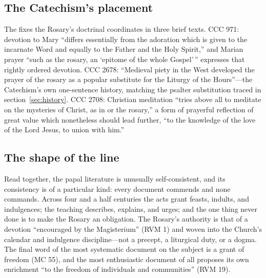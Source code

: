 \subsection{The Catechism's placement}

The  fixes the Rosary's doctrinal
coordinates in three brief texts. CCC 971: devotion to Mary ``differs
essentially from the adoration which is given to the incarnate Word and
equally to the Father and the Holy Spirit,'' and Marian prayer ``such as
the rosary, an `epitome of the whole Gospel'\,'' expresses that rightly
ordered devotion. CCC 2678: ``Medieval piety in the West developed the
prayer of the rosary as a popular substitute for the Liturgy of the
Hours''---the Catechism's own one-sentence history, matching the psalter
substitution traced in section~\ref{sec:history}. CCC 2708: Christian
meditation ``tries above all to meditate on the mysteries of Christ, as
in  or the rosary,'' a form of prayerful reflection
of great value which nonetheless should lead further, ``to the knowledge
of the love of the Lord Jesus, to union with him.''

\subsection{The shape of the line}

Read together, the papal literature is unusually self-consistent, and
its consistency is of a particular kind: every document commends and
none commands. Across four and a half centuries the acts grant feasts,
indults, and indulgences; the teaching describes, explains, and urges;
and the one thing never done is to make the Rosary an obligation. The
Rosary's authority is that of a devotion ``encouraged by the
Magisterium'' (RVM 1) and woven into the Church's calendar and
indulgence discipline---not a precept, a liturgical duty, or a dogma.
The final word of the most systematic document on the subject is a
grant of freedom (MC 55), and the most enthusiastic document of all
proposes its own enrichment ``to the freedom of individuals and
communities'' (RVM 19).
